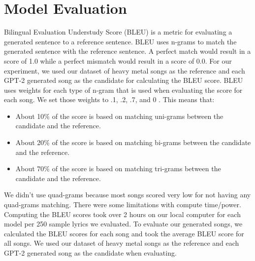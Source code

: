 \documentclass[11pt]{article}
\begin{document}
\section{Model Evaluation}

Bilingual Evaluation Understudy Score (BLEU) is a metric for evaluating a generated sentence to a reference sentence. BLEU uses n-grams to match the generated sentence with the reference sentence. A perfect match would result in a score of 1.0 while a perfect mismatch would result in a score of 0.0. For our experiment, we used our dataset of heavy metal songs as the reference and each GPT-2 generated song as the candidate for calculating the BLEU score. BLEU uses weights for each type of n-gram that is used when evaluating the score for each song. We set those weights to .1, .2, .7, and 0 \cite{BLEU}. This means that:
\begin{itemize}
\item About 10\% of the score is based on matching uni-grams between the candidate and the reference. 
\item About 20\% of the score is based on matching bi-grams between the candidate and the reference. 
\item About 70\% of the score is based on matching tri-grams between the candidate and the reference. 
\end{itemize}

We didn’t use quad-grams because most songs scored very low for not having any quad-grams matching. There were some limitations with compute time/power. Computing the BLEU scores took over 2 hours on our local computer for each model per 250 sample lyrics we evaluated. To evaluate our generated songs, we calculated the BLEU scores for each song and took the average BLEU score for all songs. We used our dataset of heavy metal songs as the reference and each GPT-2 generated song as the candidate when evaluating.
\end{document}
